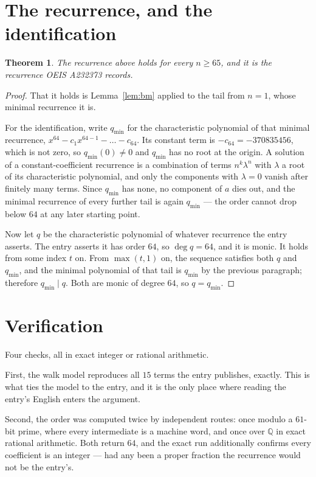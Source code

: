 \documentclass[11pt,a4paper]{article}
\theoremstyle{plain}
\newtheorem{theorem}{Theorem}
\theoremstyle{definition}
\begin{document}
\section{The recurrence, and the identification}

\begin{theorem}
The recurrence above holds for every $n\ge65$, and it is the recurrence OEIS A232373 records.
\end{theorem}

\begin{proof}
That it holds is Lemma~\ref{lem:bm} applied to the tail from $n=1$, whose minimal
recurrence it is.

For the identification, write $q_{\min}$ for the characteristic polynomial of that minimal
recurrence, $x^{64}-c_1x^{64-1}-\dots-c_{64}$. Its constant term is
$-c_{64}=-370835456$, which is not zero, so $q_{\min}(0)\neq0$ and $q_{\min}$ has no
root at the origin. A solution of a constant-coefficient recurrence is a combination of terms
$n^{k}\lambda^{n}$ with $\lambda$ a root of its characteristic polynomial, and only the
components with $\lambda=0$ vanish after finitely many terms. Since $q_{\min}$ has none, no
component of $a$ dies out, and the minimal recurrence of every further tail is again
$q_{\min}$ --- the order cannot drop below $64$ at any later starting point.

Now let $q$ be the characteristic polynomial of whatever recurrence the entry asserts. The
entry asserts it has order $64$, so $\deg q=64$, and it is monic. It holds from some
index $t$ on. From $\max(t,1)$ on, the sequence satisfies both $q$ and $q_{\min}$, and
the minimal polynomial of that tail is $q_{\min}$ by the previous paragraph; therefore
$q_{\min}\mid q$. Both are monic of degree $64$, so $q=q_{\min}$.
\end{proof}

\section{Verification}

Four checks, all in exact integer or rational arithmetic.

First, the walk model reproduces all $15$ terms the entry publishes, exactly. This is
what ties the model to the entry, and it is the only place where reading the entry's English
enters the argument.

Second, the order was computed twice by independent routes: once modulo a $61$-bit prime, where
every intermediate is a machine word, and once over $\mathbb{Q}$ in exact rational arithmetic.
Both return $64$, and the exact run additionally confirms every coefficient is an integer
--- had any been a proper fraction the recurrence would not be the entry's.
\end{document}
